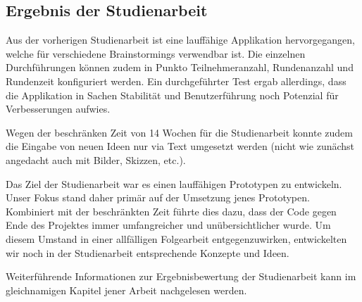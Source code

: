 \subsection{Ergebnis der Studienarbeit}
\label{subsec:result-of-sa}
Aus der vorherigen Studienarbeit ist eine lauffähige Applikation hervorgegangen, welche für verschiedene Brainstormings verwendbar ist. Die einzelnen Durchführungen können zudem in Punkto Teilnehmeranzahl, Rundenanzahl und Rundenzeit konfiguriert werden. Ein durchgeführter Test ergab allerdings, dass die Applikation in Sachen Stabilität und Benutzerführung noch Potenzial für Verbesserungen aufwies.

Wegen der beschränken Zeit von 14 Wochen für die Studienarbeit konnte zudem die Eingabe von neuen Ideen nur via Text umgesetzt werden (nicht wie zunächst angedacht auch mit Bilder, Skizzen, etc.).

Das Ziel der Studienarbeit war es einen lauffähigen Prototypen zu entwickeln. Unser Fokus stand daher primär auf der Umsetzung jenes Prototypen. Kombiniert mit der beschränkten Zeit führte dies dazu, dass der Code gegen Ende des Projektes immer umfangreicher und unübersichtlicher wurde. Um diesem Umstand in einer allfälligen Folgearbeit entgegenzuwirken, entwickelten wir noch in der Studienarbeit entsprechende Konzepte und Ideen. 

Weiterführende Informationen zur Ergebnisbewertung der Studienarbeit kann im gleichnamigen Kapitel jener Arbeit \cite{methode635-sa} nachgelesen werden.


\newpage


\newpage


\newpage


\newpage


\newpage


\newpage


\newpage


\newpage

